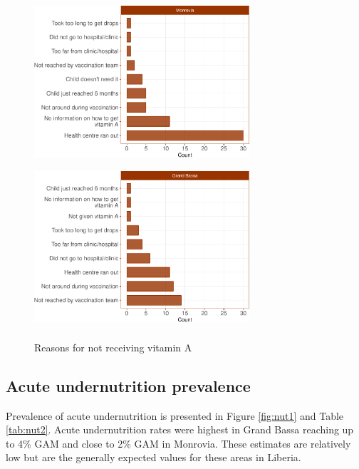 \documentclass[12pt,a4paper]{article}
\theoremstyle{definition}
\theoremstyle{definition}
\theoremstyle{definition}
\theoremstyle{remark}
\begin{document}
\begin{figure}[H]

{\centering \includegraphics[width=8cm,height=6cm]{liberiaCoverageReport_files/figure-latex/vit3a-1} \includegraphics[width=8cm,height=6cm]{liberiaCoverageReport_files/figure-latex/vit3a-2} 

}

\caption{Reasons for not receiving vitamin A}\label{fig:vit3a}
\end{figure}

\newpage

\hypertarget{acute-undernutrition-prevalence}{%
\subsection{Acute undernutrition
prevalence}\label{acute-undernutrition-prevalence}}

Prevalence of acute undernutrition is presented in Figure \ref{fig:nut1}
and Table \ref{tab:nut2}. Acute undernutrition rates were highest in
Grand Bassa reaching up to 4\% GAM and close to 2\% GAM in Monrovia.
These estimates are relatively low but are the generally expected values
for these areas in Liberia.
\end{document}
